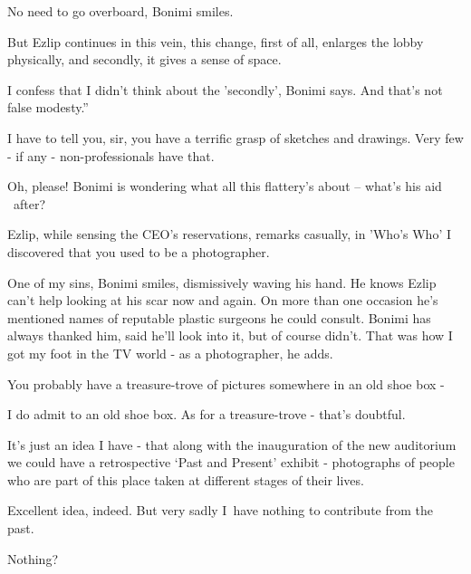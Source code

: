 \documentclass[letterpaper]{article}
\begin{document}
{\textquotedbl}No need to go overboard,{\textquotedbl} Bonimi smiles. 

But Ezlip continues in this vein, {\textquotedbl}this change, first of all, enlarges the lobby physically, and secondly,
it gives a sense of space.{\textquotedbl}

{\textquotedbl}I confess that I didn't think about the 'secondly',{\textquotedbl} Bonimi says. {\textquotedbl}And that's
not false modesty.''

{\textquotedbl}I have to tell you, sir, you have a terrific grasp of sketches and drawings. Very few - if any -
non-professionals have that.{\textquotedbl} 

{\textquotedbl}Oh, please!{\textquotedbl} Bonimi is wondering what all this flattery's about -- what's his aid \ after? 

Ezlip, while sensing the CEO's reservations, remarks casually, {\textquotedbl}in 'Who's Who' I discovered that you used
to be a photographer.{\textquotedbl}

{\textquotedbl}One of my sins,{\textquotedbl} Bonimi smiles, dismissively waving his hand. He knows Ezlip can't help
looking at his scar now and again. On more than one occasion he's mentioned names of reputable{ }plastic
surgeons he could consult. Bonimi has always thanked him, said he'll look into it, but of course didn't.
{\textquotedbl}That was how I got my foot in the TV world - as a photographer,{\textquotedbl} he adds.

{\textquotedbl}You probably have a treasure-trove of pictures somewhere in an old shoe box -{\textquotedbl} 

{\textquotedbl}I do admit to an old shoe box. As for a treasure-trove - that's doubtful.{\textquotedbl}~ 

{\textquotedbl}It's just an idea I have - that along with the inauguration of the new auditorium we could have a
retrospective `Past and Present' exhibit - photographs of people who are part of this place taken at different stages
of their lives.{\textquotedbl} 

{\textquotedbl}Excellent idea, indeed. But very sadly I~have nothing to contribute from the past.{\textquotedbl} 

{\textquotedbl}Nothing?{\textquotedbl} 
\end{document}
